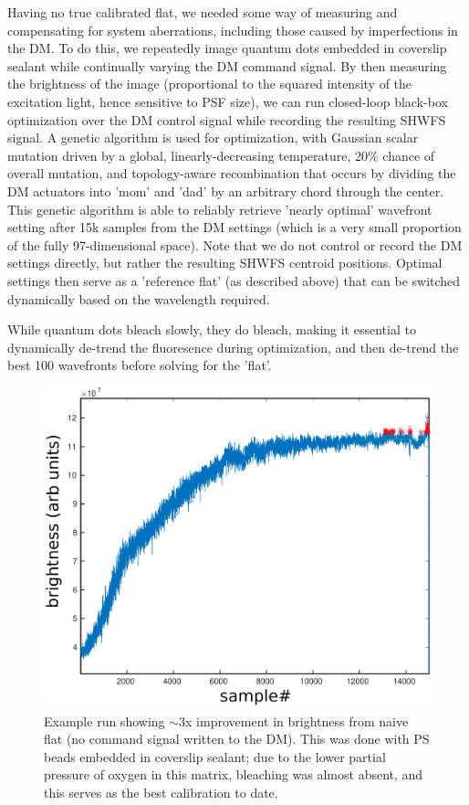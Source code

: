 \documentclass[a4paper,10pt]{article}
\begin{document}
Having no true calibrated flat, we needed some way of measuring and compensating for system aberrations, including those caused by imperfections in the DM.  To do this, we repeatedly image quantum dots embedded in coverslip sealant while continually varying the DM command signal.  By then measuring the brightness of the image (proportional to the squared intensity of the excitation light, hence sensitive to PSF size), we can run closed-loop black-box optimization over the DM control signal while recording the resulting SHWFS signal.  A genetic algorithm is used for optimization, with Gaussian scalar mutation driven by a global, linearly-decreasing temperature, 20\% chance of overall mutation, and topology-aware recombination that occurs by dividing the DM actuators into 'mom' and 'dad' by an arbitrary chord through the center.  This genetic algorithm is able to reliably retrieve 'nearly optimal' wavefront setting after 15k samples from the DM settings (which is a very small proportion of the fully 97-dimensional space).  Note that we do not control or record the DM settings directly, but rather the resulting SHWFS centroid positions.  Optimal settings then serve as a 'reference flat' (as described above) that can be switched dynamically based on the wavelength required.  

While quantum dots bleach slowly, they do bleach, making it essential to dynamically de-trend the fluoresence during optimization, and then de-trend the best 100 wavefronts before solving for the 'flat'.

\begin{figure}
\includegraphics[width=\textwidth]{PSbeads_optimization_run.pdf}
\caption{Example run showing $\sim$3x improvement in brightness from naive flat (no command signal written to the DM).  This was done with PS beads embedded in coverslip sealant; due to the lower partial pressure of oxygen in this matrix, bleaching was almost absent, and this serves as the best calibration to date.}
\end{figure}
\end{document}
